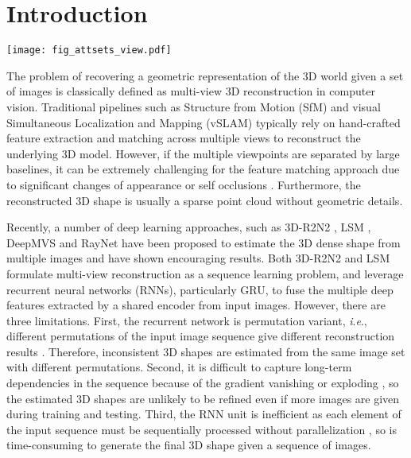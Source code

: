 \documentclass[twocolumn]{svjour3}    \pdfoutput=1
\newcommand{\faset}{FASet}
\newcommand{\ie}{\textit{i}.\textit{e}., }
\begin{document}
\section{Introduction}
\begin{figure*}[t]
\centering
   \texttt{[image: fig\_attsets\_view.pdf]}
\caption{Overview of our attentional aggregation module for multi-view 3D reconstruction. A set of $N$ images is passed through a common encoder to be a set of deep features, one element for each image. The network is trained with our \faset{} algorithm.}
\label{fig:attsets_view}
\vspace{-0.25cm}
\end{figure*}

The problem of recovering a geometric representation of the 3D world given a set of images is classically defined as multi-view 3D reconstruction in computer vision. Traditional pipelines such as Structure from Motion (SfM) \citep{Ozyesil2017} and visual Simultaneous Localization and Mapping (vSLAM) \citep{Cadena2016} typically rely on hand-crafted feature extraction and matching across multiple views to reconstruct the underlying 3D model. However, if the multiple viewpoints are separated by large baselines, it can be extremely challenging for the feature matching approach due to significant changes of appearance or self occlusions \citep{Lowe2004}. Furthermore, the reconstructed 3D shape is usually a sparse point cloud without geometric details.

Recently, a number of deep learning approaches, such as 3D-R2N2 \citep{Chan2016}, LSM \citep{Kar2017}, DeepMVS \citep{Huang2018} and RayNet \citep{Paschalidou2018} have been proposed to estimate the 3D dense shape from multiple images and have shown encouraging results. Both 3D-R2N2 \citep{Chan2016} and LSM \citep{Kar2017} formulate multi-view reconstruction as a sequence learning problem, and leverage recurrent neural networks (RNNs), particularly GRU, to fuse the multiple deep features extracted by a shared encoder from input images. However, there are three limitations. First, the recurrent network is permutation variant, \ie different permutations of the input image sequence give different reconstruction results \citep{Vinyals2016a}.
Therefore, inconsistent 3D shapes are estimated from the same image set with different permutations. Second, it is difficult to capture long-term dependencies in the sequence because of the gradient vanishing or exploding \citep{Bengio1994,Kolen2001}, so the estimated 3D shapes are unlikely to be refined even if more images are given during training and testing. Third, the RNN unit is inefficient as each element of the input sequence must be sequentially processed without parallelization \citep{Martin2018}, so is time-consuming to generate the final 3D shape given a sequence of images. 
\end{document}
